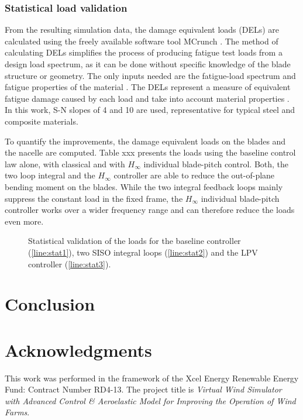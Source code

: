 \documentclass[times]{weauth}
\begin{document}
\subsubsection*{Statistical load validation}

From the resulting simulation data, the damage
equivalent loads (DELs) are calculated using the freely available software tool
MCrunch \cite{MCrunch08}. The method of calculating DELs simplifies the process
of producing fatigue test loads from a design load spectrum, as it can be done
without specific knowledge of the blade structure or geometry. The only inputs
needed are the fatigue-load spectrum and fatigue properties of the material
\cite{freebury00}. The DELs represent a measure of equivalent
fatigue damage caused by each load and take into account material properties \cite{Bossanyi03a}.
In this work, S-N slopes of 4 and 10 are used, representative for typical steel and
composite materials. 


To quantify the improvements, the damage equivalent loads on
the blades and the nacelle are computed. Table xxx presents the loads
using the baseline control law alone, with classical and with $H_\infty$
individual blade-pitch control. Both, the two loop integral and the $H_\infty$ controller are able to reduce the
out-of-plane bending moment on the blades. While the two integral feedback loops
mainly suppress the constant load in the fixed frame, the
$H_\infty$ individual blade-pitch controller works over a wider frequency range
and can therefore reduce the loads even more.

\begin{figure}[hbt]
	\centering
	
	\caption{Statistical validation of the loads for the baseline controller (\ref{line:stat1}), two SISO integral loops (\ref{line:stat2}) and the LPV controller (\ref{line:stat3}).}
	\label{fig:load_stat}	
\end{figure}



\newpage
\section{Conclusion}

\section{Acknowledgments}
	This work was performed in the framework of the Xcel Energy Renewable Energy Fund: Contract Number RD4-13.
	The project title is \textit{Virtual Wind Simulator with Advanced Control \& Aeroelastic Model for Improving the
		Operation of Wind Farms}. 	








\end{document}
